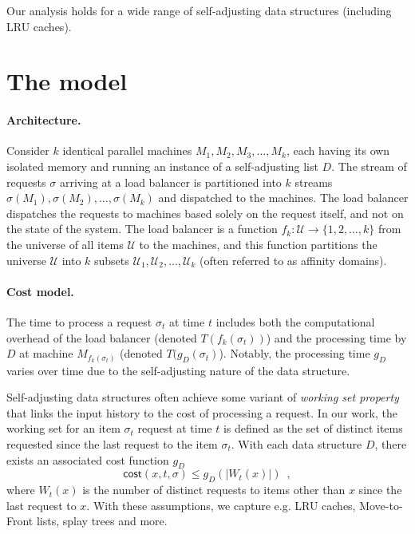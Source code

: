 Our analysis holds for a wide range of self-adjusting data structures (including LRU caches).

\section{The model}
\label{sec:app:model}

\paragraph{Architecture.}

Consider $k$ identical parallel machines $M_1, M_2, M_3, \ldots, M_k$, each having its own isolated memory and running an instance of a self-adjusting list $D$.
The stream of requests $\sigma$ arriving at a load balancer is partitioned into $k$ streams $\sigma(M_1), \sigma(M_2), \ldots, \sigma(M_k)$ and dispatched to the machines.
The load balancer dispatches the requests to machines based solely on the request itself, and not on the state of the system.
The load balancer is a function $f_k : \mathcal{U} \to \{1, 2, \ldots, k\}$ from the universe of all items $\mathcal{U}$ to the machines, and this function partitions the universe $\mathcal{U}$ into $k$ subsets $\mathcal{U}_1, \mathcal{U}_2, \ldots, \mathcal{U}_k$ (often referred to as affinity domains).

\paragraph{Cost model.}

The time to process a request $\sigma_t$ at time $t$ includes both the computational overhead of the load balancer (denoted $T(f_k(\sigma_t))$) and the processing time by $D$ at machine $M_{f_k(\sigma_t)}$ (denoted $T(g_D(\sigma_t)$).
Notably, the processing time $g_D$ varies over time due to the self-adjusting nature of the data structure.

Self-adjusting data structures often achieve some variant of \emph{working set property} that links the input history to the cost of processing a request.
In our work, the working set for an item $\sigma_t$ request at time $t$ is defined as the set of distinct items requested since the last request to the item $\sigma_t$.
With each data structure $D$, there exists an associated cost function $g_D$ 
\[
	\textsf{cost}(x, t, \sigma) \le g_D(|W_t(x)|) \enspace ,
\]
where $W_t(x)$ is the number of distinct requests to items other than $x$ since the last request to $x$.
With these assumptions, we capture e.g. LRU caches, Move-to-Front lists, splay trees and more. 




